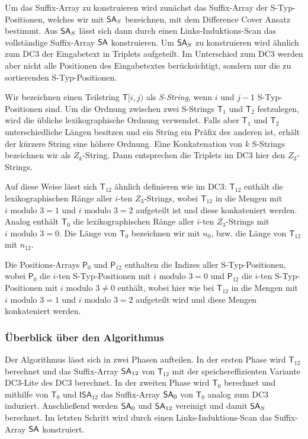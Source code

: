 Um das Suffix-Array zu konstruieren wird zunächst das Suffix-Array der S-Typ-Positionen, welches wir mit $\sa_{S}$ bezeichnen, mit dem Difference Cover Ansatz bestimmt. Aus $\sa_{S}$ lässt sich dann durch einen Links-Induktions-Scan das vollständige Suffix-Array $\sa$ konstruieren. Um $\sa_{S}$ zu konstruieren wird ähnlich zum DC3 der Eingabetext in Triplets aufgeteilt. Im Unterschied zum DC3 werden aber nicht alle Positionen des Eingabetextes berücksichtigt, sondern nur die zu sortierenden S-Typ-Positionen. \par
Wir bezeichnen einen Teilstring $\mathsf{T}[i,j)$ als \textit{S-String}, wenn $i$ und $j-1$ S-Typ-Positionen sind. Um die Ordnung zwischen zwei S-Strings $\mathsf{T}_{1}$ und $\mathsf{T}_{2}$ festzulegen, wird die übliche lexikographische Ordnung verwendet. Falls aber $\mathsf{T}_{1}$ und $\mathsf{T}_{2}$ unterschiedliche Längen besitzen und ein String ein Präfix des anderen ist, erhält der kürzere String eine höhere Ordnung.  Eine Konkatenation von $k$ S-Strings bezeichnen wir als $Z_k$-String. Dann entsprechen die Triplets im DC3 hier den $Z_3$-Strings. \par
Auf diese Weise lässt sich $\mathsf{T}_{12}$ ähnlich definieren wie im DC3: $\mathsf{T}_{12}$ enthält die lexikographischen Ränge aller $i$-ten $Z_3$-Strings, wobei $\mathsf{T}_{12}$ in die Mengen mit $i \text{ modulo } 3 = 1$ und $i \text{ modulo } 3 = 2$ aufgeteilt ist und diese konkateniert werden. Analog enthält $\mathsf{T}_{0}$ die lexikographischen Ränge aller $i$-ten $Z_3$-Strings mit $i \text{ modulo } 3 = 0$. Die Länge von $\mathsf{T}_{0}$ bezeichnen wir mit $n_0$, bzw. die Länge von $\mathsf{T}_{12}$ mit $n_{12}$.\par
Die Positions-Arrays $\mathsf{P}_0$ und $\mathsf{P}_{12}$ enthalten die Indizes aller S-Typ-Positionen, wobei $\mathsf{P}_0$ die $i$-ten S-Typ-Positionen mit $i \text{ modulo } 3 = 0$ und $\mathsf{P}_{12}$ die $i$-ten S-Typ-Positionen mit $i \text{ modulo } 3 \ne 0$ enthält, wobei hier wie bei $\mathsf{T}_{12}$ in die Mengen mit $i \text{ modulo } 3 = 1$ und $i \text{ modulo } 3 = 2$ aufgeteilt wird und diese Mengen konkateniert werden. \par

\subsubsection{Überblick über den Algorithmus}

Der Algorithmus lässt sich in zwei Phasen aufteilen. In der ersten Phase wird $\mathsf{T}_{12}$ berechnet und das Suffix-Array $\sa_{12}$ von $\mathsf{T}_{12}$ mit der speichereffizienten Variante DC3-Lite des DC3 berechnet. In der zweiten Phase wird $\mathsf{T}_{0}$ berechnet und mithilfe von $\mathsf{T}_{0}$ und $\mathsf{ISA}_{12}$ das Suffix-Array $\sa_0$ von $\mathsf{T}_{0}$ analog zum DC3 induziert. Anschließend werden $\sa_0$ und $\sa_{12}$ vereinigt und damit $\sa_{S}$ berechnet. Im letzten Schritt wird durch einen Links-Induktions-Scan das Suffix-Array $\sa$ konstruiert. \par

